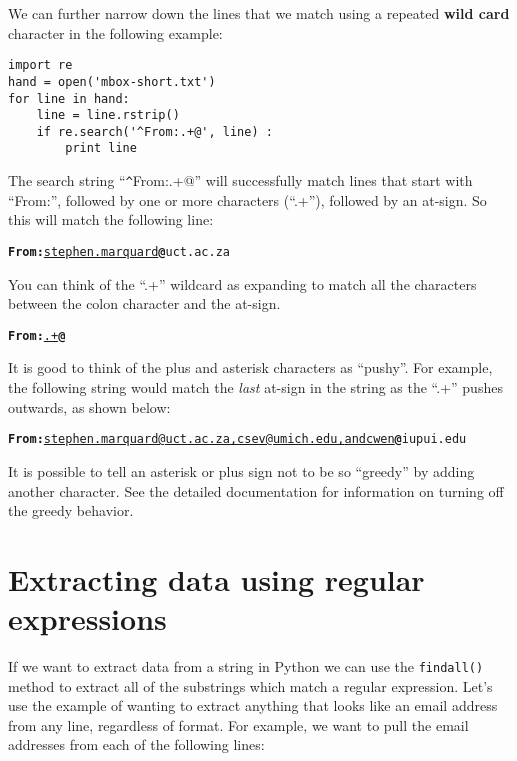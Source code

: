 We can further narrow down the lines that we match using a repeated {\bf wild card} character in
the following example:

\beforeverb
\begin{verbatim}
import re
hand = open('mbox-short.txt')
for line in hand:
    line = line.rstrip()
    if re.search('^From:.+@', line) :
        print line
\end{verbatim}
\afterverb
%
The search string ``\verb"^"From:.+@'' will successfully match lines that start with ``From:'',
followed by one or more characters (``.+''), followed by an at-sign.  So this will match the
following line:

\beforeverb
\begin{alltt}
{\bf From:}\underline{ stephen.marquard}{\bf @}uct.ac.za
\end{alltt}
\afterverb

You can think of the ``.+'' wildcard as expanding to match all the characters between the
colon character and the at-sign.

\beforeverb
\begin{alltt}
{\bf From:}\underline{.+}{\bf @}
\end{alltt}
\afterverb

It is good to think of the plus and asterisk characters as ``pushy''.  For example, the following
string would match the {\em last} at-sign in the string as the ``.+'' pushes outwards, as shown below:

\beforeverb
\begin{alltt}
{\bf From:}\underline{ stephen.marquard@uct.ac.za, csev@umich.edu, and cwen}{\bf @}iupui.edu
\end{alltt}
\afterverb

It is possible to tell an asterisk or plus sign not to be so ``greedy'' by adding
another character.   See the detailed documentation for information on turning off the
greedy behavior.

\section{Extracting data using regular expressions}

If we want to extract data from a string in Python we can use the {\tt findall()} method to extract
all of the substrings which match a regular expression.  Let's use the example of wanting to extract
anything that looks like an email address from any line, regardless of format.  For example, we want
to pull the email addresses from each of the following lines:

